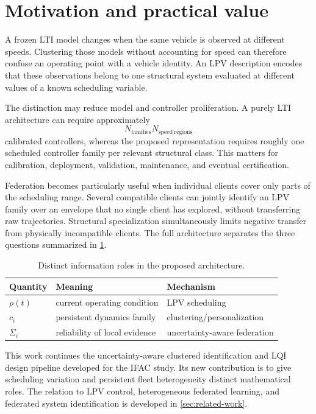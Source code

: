 \section{Motivation and practical value}
A frozen LTI model changes when the same vehicle is observed at different speeds.
Clustering those models without accounting for speed can therefore confuse an
operating point with a vehicle identity. An LPV description encodes that these
observations belong to one structural system evaluated at different values of a
known scheduling variable.

The distinction may reduce model and controller proliferation. A purely LTI
architecture can require approximately
\begin{equation}
  N_{\mathrm{families}}N_{\mathrm{speed\ regions}}
\end{equation}
calibrated controllers, whereas the proposed representation requires roughly one
scheduled controller family per relevant structural class. This matters for
calibration, deployment, validation, maintenance, and eventual certification.

Federation becomes particularly useful when individual clients cover only parts
of the scheduling range. Several compatible clients can jointly identify an LPV
family over an envelope that no single client has explored, without transferring
raw trajectories. Structural specialization simultaneously limits negative
transfer from physically incompatible clients. The full architecture separates
the three questions summarized in \cref{tab:information-roles}.
\begin{table}[ht]
\centering
\caption{Distinct information roles in the proposed architecture.}
\label{tab:information-roles}
\begin{tabular}{lll}
\toprule
Quantity & Meaning & Mechanism\\
\midrule
$\rho(t)$ & current operating condition & LPV scheduling\\
$c_i$ & persistent dynamics family & clustering/personalization\\
$\Sigma_i$ & reliability of local evidence & uncertainty-aware federation\\
\bottomrule
\end{tabular}
\end{table}

This work continues the uncertainty-aware clustered identification and LQI design
pipeline developed for the IFAC study. Its new contribution is to give scheduling
variation and persistent fleet heterogeneity distinct mathematical roles.
The relation to LPV control, heterogeneous federated learning, and federated
system identification is developed in \cref{sec:related-work}.
